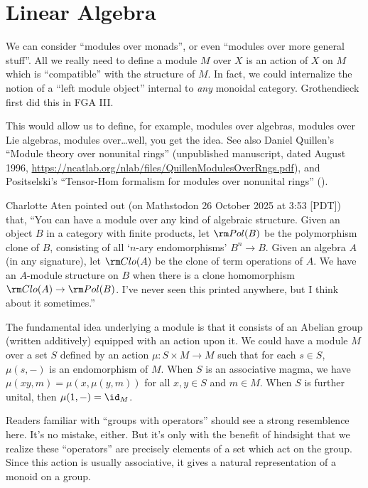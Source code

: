 
\chapter{Linear Algebra}

\begin{remark}
We can consider ``modules over monads'', or even ``modules over more
general stuff''. All we really need to define a module $M$ over $X$ is an
action of $X$ on $M$ which is ``compatible'' with the structure of
$M$. In fact, we could internalize the notion of a ``left module
object'' internal to \emph{any} monoidal category. Grothendieck first
did this in FGA III.

This would allow us to define, for example, modules over algebras,
modules over Lie algebras, modules over\dots well, you get the
idea. See also Daniel Quillen's ``Module theory over nonunital rings''
(unpublished manuscript, dated August 1996, \url{https://ncatlab.org/nlab/files/QuillenModulesOverRngs.pdf}),
and Positselski's ``Tensor-Hom formalism for modules over nonunital
rings'' ().

Charlotte Aten pointed out (on Mathstodon 26 October 2025 at
3:53 [PDT]) that, ``You can have a module over any kind of
algebraic structure. Given an object $B$ in a category with finite
products, let ${\rm Pol}(B)$ be the polymorphism clone of $B$, consisting of
all `$n$-ary endomorphisms' $B^{n}\to B$. Given an algebra $A$ (in any
signature), let ${\rm Clo}(A)$ be the clone of term operations of $A$. We have
an $A$-module structure on $B$ when there is a clone homomorphism
${\rm Clo}(A)\to{\rm Pol}(B)$. I've never seen this printed anywhere,
but I think about it sometimes.''
\end{remark}

\begin{remark}
The fundamental idea underlying a module is that it consists of an
Abelian group (written additively) equipped with an action upon it. 
We could have a module $M$ over a set $S$ defined by an action
$\mu\colon S\times M\to M$ such that for each $s\in S$, $\mu(s,-)$ is
an endomorphism of $M$. When $S$ is an associative magma,
we have $\mu(xy,m)=\mu(x,\mu(y,m))$ for all $x,y\in S$ and $m\in M$.
When $S$ is further unital, then $\mu(1,-)=\id_{M}$.

Readers familiar with ``groups with operators'' should see a strong
resemblence here. It's no mistake, either. But it's only with the
benefit of hindsight that we realize these ``operators'' are precisely
elements of a set which act on the group. Since this action is usually
associative, it gives a natural representation of a monoid on a group.
\end{remark}

